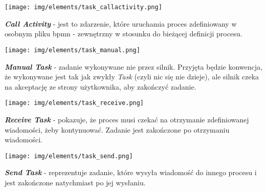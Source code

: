 \documentclass[declaration,shortabstract,mgr]{iithesis}
\begin{document}
\vspace{\mypointsep}

\noindent\begin{minipage}[t]{0.1\textwidth}\vspace{0pt}
\texttt{[image: img/elements/task\_callactivity.png]}
\end{minipage}\hfill
\begin{minipage}[t]{0.85\textwidth}\vspace{0pt}
\textbf{\textit{Call Activity}} - jest to zdarzenie, które uruchamia proces zdefiniowany w osobnym pliku bpmn - zewnętrzny w stosunku do bieżącej definicji procesu.
\end{minipage}

\vspace{\mypointsep}

\noindent\begin{minipage}[t]{0.1\textwidth}\vspace{0pt}
\texttt{[image: img/elements/task\_manual.png]}
\end{minipage}\hfill
\begin{minipage}[t]{0.85\textwidth}\vspace{0pt}
\textbf{\textit{Manual Task}} - zadanie wykonywane nie przez silnik. Przyjęta będzie konwencja, że wykonywane jest tak jak zwykły \textit{Task} (czyli nic się nie dzieje), ale silnik czeka na akceptację ze strony użytkownika, aby zakończyć zadanie.
\end{minipage}

\vspace{\mypointsep}

\noindent\begin{minipage}[t]{0.1\textwidth}\vspace{0pt}
\texttt{[image: img/elements/task\_receive.png]}
\end{minipage}\hfill
\begin{minipage}[t]{0.85\textwidth}\vspace{0pt}
\textbf{\textit{Receive Task}} - pokazuje, że proces musi czekać na otrzymanie zdefiniowanej wiadomości, żeby kontynuować. Zadanie jest zakończone po otrzymaniu wiadomości.
\end{minipage}

\vspace{\mypointsep}

\noindent\begin{minipage}[t]{0.1\textwidth}\vspace{0pt}
\texttt{[image: img/elements/task\_send.png]}
\end{minipage}\hfill
\begin{minipage}[t]{0.85\textwidth}\vspace{0pt}
\textbf{\textit{Send Task}} - reprezentuje zadanie, które wysyła wiadomość do innego procesu i jest zakończone natychmiast po jej wysłaniu.
\end{minipage}
\end{document}
